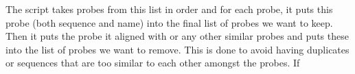 The script takes probes from this list in order and for each probe, it puts this probe (both sequence and name) into the final list of probes we want to keep. Then it puts the probe it aligned with or any other 
similar probes and puts these into the list of probes we want to remove. This is done to avoid having duplicates or sequences that are too similar to each other amongst the probes. If 
